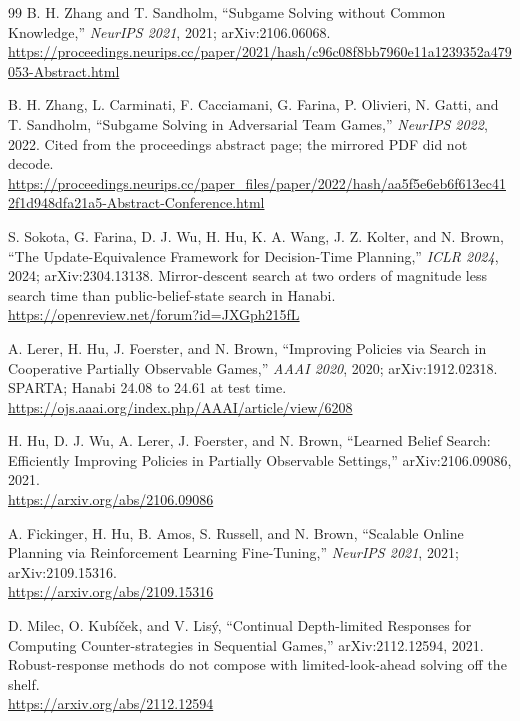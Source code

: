 \begin{thebibliography}{99}
B. H. Zhang and T. Sandholm, ``Subgame Solving without Common Knowledge,''
\emph{NeurIPS 2021}, 2021; arXiv:2106.06068.\\
\url{https://proceedings.neurips.cc/paper/2021/hash/c96c08f8bb7960e11a1239352a479053-Abstract.html}

B. H. Zhang, L. Carminati, F. Cacciamani, G. Farina, P. Olivieri, N. Gatti, and
T. Sandholm, ``Subgame Solving in Adversarial Team Games,'' \emph{NeurIPS 2022},
2022. Cited from the proceedings abstract page; the mirrored PDF did not
decode.\\
\url{https://proceedings.neurips.cc/paper_files/paper/2022/hash/aa5f5e6eb6f613ec412f1d948dfa21a5-Abstract-Conference.html}

S. Sokota, G. Farina, D. J. Wu, H. Hu, K. A. Wang, J. Z. Kolter, and N. Brown,
``The Update-Equivalence Framework for Decision-Time Planning,'' \emph{ICLR
2024}, 2024; arXiv:2304.13138. Mirror-descent search at two orders of magnitude
less search time than public-belief-state search in Hanabi.\\
\url{https://openreview.net/forum?id=JXGph215fL}

A. Lerer, H. Hu, J. Foerster, and N. Brown, ``Improving Policies via Search in
Cooperative Partially Observable Games,'' \emph{AAAI 2020}, 2020;
arXiv:1912.02318. SPARTA; Hanabi 24.08 to 24.61 at test time.\\
\url{https://ojs.aaai.org/index.php/AAAI/article/view/6208}

H. Hu, D. J. Wu, A. Lerer, J. Foerster, and N. Brown, ``Learned Belief Search:
Efficiently Improving Policies in Partially Observable Settings,''
arXiv:2106.09086, 2021.\\
\url{https://arxiv.org/abs/2106.09086}

A. Fickinger, H. Hu, B. Amos, S. Russell, and N. Brown, ``Scalable Online
Planning via Reinforcement Learning Fine-Tuning,'' \emph{NeurIPS 2021}, 2021;
arXiv:2109.15316.\\
\url{https://arxiv.org/abs/2109.15316}

D. Milec, O. Kub\'i\v{c}ek, and V. Lis\'y, ``Continual Depth-limited Responses
for Computing Counter-strategies in Sequential Games,'' arXiv:2112.12594, 2021.
Robust-response methods do not compose with limited-look-ahead solving off the
shelf.\\
\url{https://arxiv.org/abs/2112.12594}


\end{thebibliography}
